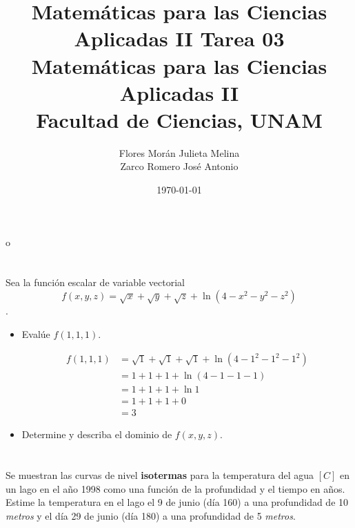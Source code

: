 o\documentclass[12pt]{article}
\title{Matemáticas para las Ciencias Aplicadas II}
\title{
        \textbf{Tarea 03} \\
        \vspace{1ex}
        \large Matemáticas para las Ciencias Aplicadas II \\
        Facultad de Ciencias, UNAM}
\date{\today}
\author{Flores Morán Julieta Melina \\ Zarco Romero José Antonio}
\begin{document}
\maketitle

\section{}

Sea la función escalar de variable vectorial $$f(x,y,z)= \sqrt{x} +\sqrt{y} +\sqrt{z} + \ln{(4-x^2-y^2-z^2)}$$.

\begin{itemize}[format=\textbf]

\item Evalúe $f(1,1,1)$.

\begin{align*}
f(1,1,1)
&= \sqrt{1} +\sqrt{1} +\sqrt{1} + \ln{(4-1^2-1^2-1^2)} \\
&= 1+1+1+ \ln{(4-1-1-1)} \\
&= 1+1+1+ \ln{1} \\
&= 1+1+1+0 \\
&= 3
\end{align*}

\item Determine y describa el dominio de $f(x, y, z)$.

\end{itemize}

\section{}

 Se muestran las curvas de nivel \textbf{isotermas} para la temperatura del agua $[C]$ en un lago en el año 1998 como una función de la profundidad y el tiempo en años. Estime la temperatura en el lago el 9 de junio (día 160) a una profundidad de 10 \textit{metros} y el día 29 de junio (día 180) a una profundidad de 5 \textit{metros}.

\section{}
\end{document}
